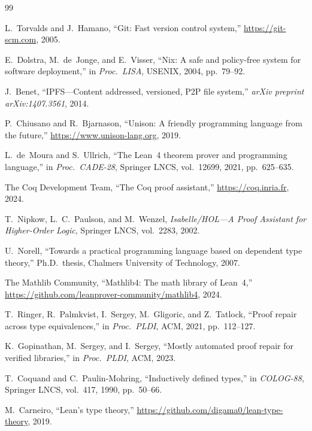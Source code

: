 \begin{thebibliography}{99}

  L.~Torvalds and J.~Hamano,
  ``Git: Fast version control system,''
  \url{https://git-scm.com}, 2005.

  E.~Dolstra, M.~de~Jonge, and E.~Visser,
  ``Nix: A safe and policy-free system for software deployment,''
  in \emph{Proc.\ LISA}, USENIX, 2004, pp.~79--92.

  J.~Benet,
  ``IPFS---Content addressed, versioned, P2P file system,''
  \emph{arXiv preprint arXiv:1407.3561}, 2014.

  P.~Chiusano and R.~Bjarnason,
  ``Unison: A friendly programming language from the future,''
  \url{https://www.unison-lang.org}, 2019.

  L.~de~Moura and S.~Ullrich,
  ``The Lean~4 theorem prover and programming language,''
  in \emph{Proc.\ CADE-28}, Springer LNCS, vol.~12699, 2021,
  pp.~625--635.

  The Coq Development Team,
  ``The Coq proof assistant,''
  \url{https://coq.inria.fr}, 2024.

  T.~Nipkow, L.~C.~Paulson, and M.~Wenzel,
  \emph{Isabelle/HOL---A Proof Assistant for Higher-Order Logic},
  Springer LNCS, vol.~2283, 2002.

  U.~Norell,
  ``Towards a practical programming language based on dependent type theory,''
  Ph.D.\ thesis, Chalmers University of Technology, 2007.

  The Mathlib Community,
  ``Mathlib4: The math library of Lean~4,''
  \url{https://github.com/leanprover-community/mathlib4}, 2024.

  T.~Ringer, R.~Palmkvist, I.~Sergey, M.~Gligoric, and Z.~Tatlock,
  ``Proof repair across type equivalences,''
  in \emph{Proc.\ PLDI}, ACM, 2021, pp.~112--127.

  K.~Gopinathan, M.~Sergey, and I.~Sergey,
  ``Mostly automated proof repair for verified libraries,''
  in \emph{Proc.\ PLDI}, ACM, 2023.

  T.~Coquand and C.~Paulin-Mohring,
  ``Inductively defined types,''
  in \emph{COLOG-88}, Springer LNCS, vol.~417, 1990, pp.~50--66.

  M.~Carneiro,
  ``Lean's type theory,''
  \url{https://github.com/digama0/lean-type-theory}, 2019.


\end{thebibliography}
